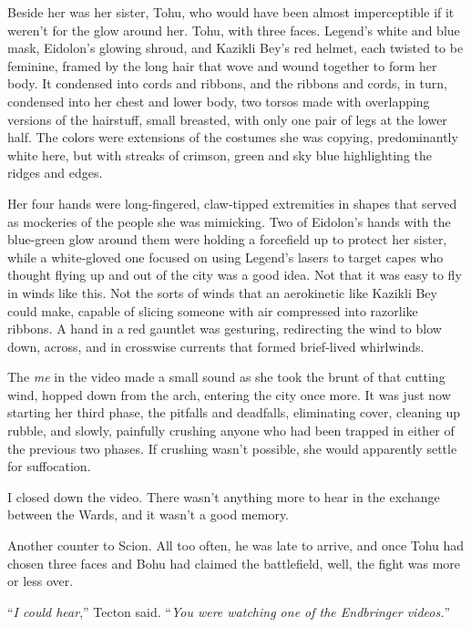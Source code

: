 Beside her was her sister, Tohu, who would have been almost imperceptible if it weren't for the glow around her.  Tohu, with three faces.  Legend's white and blue mask, Eidolon's glowing shroud, and Kazikli Bey's red helmet, each twisted to be feminine, framed by the long hair that wove and wound together to form her body.  It condensed into cords and ribbons, and the ribbons and cords, in turn, condensed into her chest and lower body, two torsos made with overlapping versions of the hairstuff, small breasted, with only one pair of legs at the lower half.  The colors were extensions of the costumes she was copying, predominantly white here, but with streaks of crimson, green and sky blue highlighting the ridges and edges.



Her four hands were long-fingered, claw-tipped extremities in shapes that served as mockeries of the people she was mimicking.  Two of Eidolon's hands with the blue-green glow around them were holding a forcefield up to protect her sister, while a white-gloved one focused on using Legend's lasers to target capes who thought flying up and out of the city was a good idea.  Not that it was easy to fly in winds like this.  Not the sorts of winds that an aerokinetic like Kazikli Bey could make, capable of slicing someone with air compressed into razorlike ribbons.  A hand in a red gauntlet was gesturing, redirecting the wind to blow down, across, and in crosswise currents that formed brief-lived whirlwinds.



The \emph{me} in the video made a small sound as she took the brunt of that cutting wind, hopped down from the arch, entering the city once more.  It was just now starting her third phase, the pitfalls and deadfalls, eliminating cover, cleaning up rubble, and slowly, painfully crushing anyone who had been trapped in either of the previous two phases.  If crushing wasn't possible, she would apparently settle for suffocation.



I closed down the video.  There wasn't anything more to hear in the exchange between the Wards, and it wasn't a good memory.



Another counter to Scion.  All too often, he was late to arrive, and once Tohu had chosen three faces and Bohu had claimed the battlefield, well, the fight was more or less over.



``\emph{I could hear},'' Tecton said.  ``\emph{You were watching one of the Endbringer videos.}''



